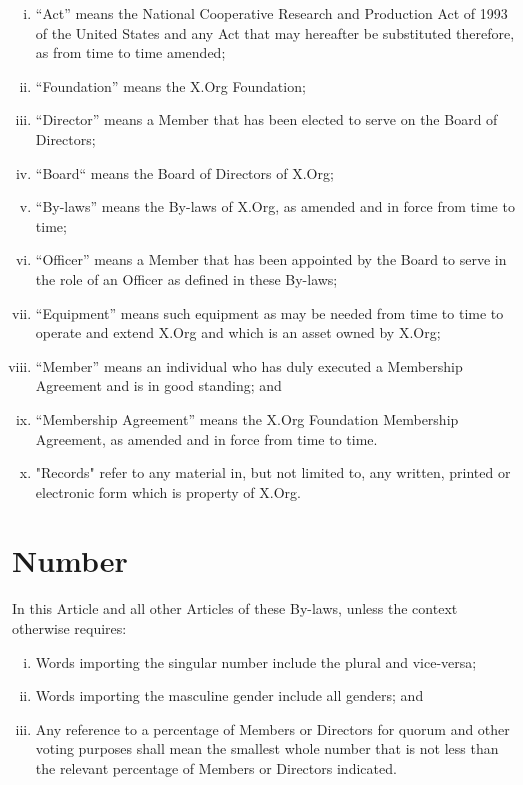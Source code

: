 \documentclass[10pt, english]{bylaws}
\begin{document}
\begin{enumerate}[(i)\hspace{.2cm}]
	\item ``Act'' means the National Cooperative Research and Production Act
	of 1993 of the United States and any Act that may hereafter be
	substituted therefore, as from time to time amended;

	\item ``Foundation'' means the X.Org Foundation;

	\item ``Director'' means a Member that has been elected to serve on the
	Board of Directors;

	\item ``Board`` means the Board of Directors of X.Org;

	\item ``By-laws'' means the By-laws of X.Org, as amended and in force
	from time to time;

	\item ``Officer'' means a Member that has been appointed by the Board to
	serve in the role of an Officer as defined in these By-laws;

	\item ``Equipment'' means such equipment as may be needed from time to
	time to operate and extend X.Org and which is an asset owned by X.Org;

	\item ``Member'' means an individual who has duly executed a Membership
	Agreement and is in good standing; and

	\item ``Membership Agreement'' means the X.Org Foundation Membership
	Agreement, as amended and in force from time to time.

	\item "Records" refer to any material in, but not limited to, any written,
	printed or electronic form which is property of X.Org.
\end{enumerate}

\section{Number}
In this Article and all other Articles of these By-laws, unless the context
otherwise requires:

\begin{enumerate}[(i)\hspace{.2cm}]
	\item Words importing the singular number include the plural and
		vice-versa;

	\item Words importing the masculine gender include all genders; and

	\item Any reference to a percentage of Members or Directors for quorum
	and other voting purposes shall mean the smallest whole number
	that is not less than the relevant percentage of Members or Directors
	indicated.
\end{enumerate}
\end{document}
